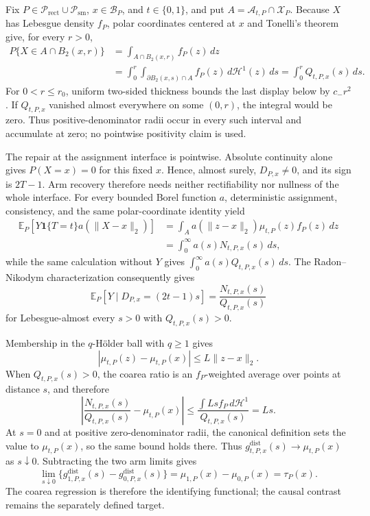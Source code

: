Fix \(P\in\mathcal P_{\mathrm{rect}}\cup\mathcal P_{\mathrm{sm}}\), \(x\in\mathcal B_P\), and \(t\in\{0,1\}\), and put \(A=\mathcal A_{t,P}\cap\mathcal X_P\).  Because \(X\) has Lebesgue density \(f_P\), polar coordinates centered at \(x\) and Tonelli's theorem give, for every \(r>0\),
\[
\begin{aligned}
P\{X\in A\cap B_2(x,r)\}
&=\int_{A\cap B_2(x,r)}f_P(z)\,dz\\
&=\int_0^r\int_{\partial B_2(x,s)\cap A}f_P(z)\,d\mathcal H^1(z)\,ds
=\int_0^rQ_{t,P,x}(s)\,ds.
\end{aligned}
\]
For \(0<r\leq r_0\), uniform two-sided thickness bounds the last display below by \(c_-r^2\).  If \(Q_{t,P,x}\) vanished almost everywhere on some \((0,r)\), the integral would be zero.  Thus positive-denominator radii occur in every such interval and accumulate at zero; no pointwise positivity claim is used.

The repair at the assignment interface is pointwise.  Absolute continuity alone gives \(P(X=x)=0\) for this fixed \(x\).  Hence, almost surely, \(D_{P,x}\ne0\), and its sign is \(2T-1\).  Arm recovery therefore needs neither rectifiability nor nullness of the whole interface.  For every bounded Borel function \(a\), deterministic assignment, consistency, and the same polar-coordinate identity yield
\[
\begin{aligned}
\mathbb E_P\!\left[Y\mathbf1\{T=t\}a(\lVert X-x\rVert_2)\right]
&=\int_Aa(\lVert z-x\rVert_2)\mu_{t,P}(z)f_P(z)\,dz\\
&=\int_0^\infty a(s)N_{t,P,x}(s)\,ds,
\end{aligned}
\]
while the same calculation without \(Y\) gives \(\int_0^\infty a(s)Q_{t,P,x}(s)\,ds\).  The Radon--Nikodym characterization consequently gives
\[
\mathbb E_P[Y\mid D_{P,x}=(2t-1)s]
=\frac{N_{t,P,x}(s)}{Q_{t,P,x}(s)}
\]
for Lebesgue-almost every \(s>0\) with \(Q_{t,P,x}(s)>0\).

Membership in the \(q\)-H\"older ball with \(q\geq1\) gives
\[
|\mu_{t,P}(z)-\mu_{t,P}(x)|\leq L\lVert z-x\rVert_2.
\]
When \(Q_{t,P,x}(s)>0\), the coarea ratio is an \(f_P\)-weighted average over points at distance \(s\), and therefore
\[
\left|\frac{N_{t,P,x}(s)}{Q_{t,P,x}(s)}-\mu_{t,P}(x)\right|
\leq\frac{\int Ls f_P\,d\mathcal H^1}{Q_{t,P,x}(s)}=Ls.
\]
At \(s=0\) and at positive zero-denominator radii, the canonical definition sets the value to \(\mu_{t,P}(x)\), so the same bound holds there.  Thus \(g^{\mathrm{dist}}_{t,P,x}(s)\to\mu_{t,P}(x)\) as \(s\downarrow0\).  Subtracting the two arm limits gives
\[
\lim_{s\downarrow0}\{g^{\mathrm{dist}}_{1,P,x}(s)-g^{\mathrm{dist}}_{0,P,x}(s)\}
=\mu_{1,P}(x)-\mu_{0,P}(x)=\tau_P(x).
\]
The coarea regression is therefore the identifying functional; the causal contrast remains the separately defined target.